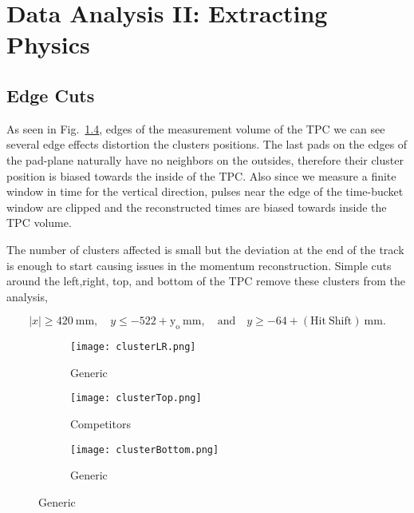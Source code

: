\chapter{Data Analysis II: Extracting Physics}

\section{Edge Cuts}
As seen in Fig.~\ref{fig:edge}, edges of the measurement volume of the TPC we can see several edge effects distortion the clusters positions. The last pads on the edges of the pad-plane naturally have no neighbors on the outsides, therefore their cluster position is biased towards the inside of the TPC. Also since we measure a finite window in time for the vertical direction, pulses near the edge of the time-bucket window are clipped and the reconstructed times are biased towards inside the TPC volume. 

The number of clusters affected is small but the deviation at the end of the track is enough to start causing issues in the momentum reconstruction. Simple cuts around the left,right, top, and bottom of the TPC remove these clusters from the analysis,

\begin{equation*}
  |x|\geq420~\mathrm{mm},\quad y\leq-522+\mathrm{y_o}~\mathrm{mm},
  \quad\mathrm{and}\quad y\geq-64+\mathrm{(Hit\ Shift)}~\mathrm{mm}.
\label{eq:hitshift}
\end{equation*}

\begin{figure}[!htb]
    \centering
    \begin{subfigure}[t]{0.45\textwidth}
        \centering
        \texttt{[image: clusterLR.png]} 
        \caption{Generic} \label{fig:mom_S_before}
    \end{subfigure}
    \hfill
    \begin{subfigure}[t]{0.45\textwidth}
        \centering
        \texttt{[image: clusterTop.png]} 
        \caption{Competitors} \label{fig:mom_L_before}
    \end{subfigure}
    
    \begin{subfigure}[t]{0.45\textwidth}
        \centering
        \texttt{[image: clusterBottom.png]} 
        \caption{Generic} \label{fig:mom_S_after}
    \end{subfigure}
   
\label{fig:edge}
\end{figure}

